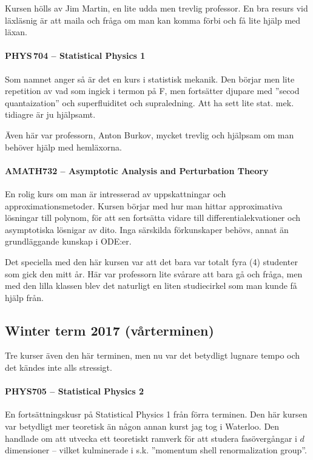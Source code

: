 \documentclass[11pt,a4paper, english, swedish]{article}
\begin{document}
Kursen hölls av Jim Martin, en lite udda men trevlig professor. En bra
resurs vid läxläsnig är att maila och fråga om man kan komma förbi och
få lite hjälp med läxan. 


\paragraph{PHYS\,704 -- Statistical Physics 1}
Som namnet anger så är det en kurs i statistisk mekanik. Den börjar
men lite repetition av vad som ingick i termon på F, men fortsätter
djupare med ''secod quantaization'' och superfluiditet och
supraledning. Att ha sett lite stat. mek. tidiagre är ju hjälpsamt.

Även här var professorn, Anton Burkov, mycket trevlig och hjälpsam om
man behöver hjälp med hemläxorna. 


\paragraph{AMATH732 -- Asymptotic Analysis and Perturbation Theory}
En rolig kurs om man är intresserad av uppskattningar och
approximationsmetoder. Kursen börjar med hur man hittar approximativa
lösningar till polynom, för att sen fortsätta vidare till
differentialekvationer och asymptotiska lösnigar av dito. 
Inga särskilda förkunskaper behövs, annat än grundläggande kunskap i
ODE:er. 

Det speciella med den här kursen var att det bara var totalt fyra (4)
studenter som gick den mitt år. Här var professorn lite svårare att
bara gå och fråga, men med den lilla klassen blev det naturligt en
liten studiecirkel som man kunde få hjälp från. 


\subsection{Winter term 2017 (vårterminen)}
Tre kurser även den här terminen, men nu var det betydligt lugnare
tempo och det kändes inte alls stressigt.

\paragraph{PHYS705 -- Statistical Physics 2}
En fortsättningskusr på Statistical Physics 1 från förra terminen. Den
här kursen var betydligt mer teoretisk än någon annan kurst jag tog i
Waterloo. Den handlade om att utvecka ett teoretiskt ramverk för att
studera fas\-övergångar i $d$ dimensioner -- vilket kulminerade i
s.k. ''momentum shell renormalization group''.  
\end{document}
